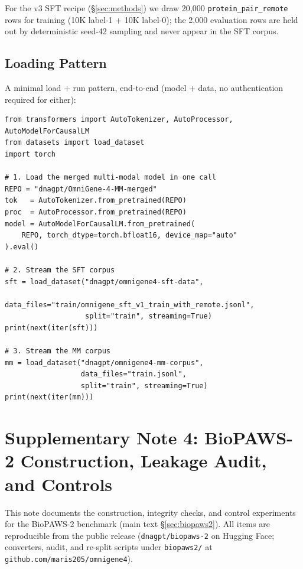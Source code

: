 \documentclass[11pt]{article}
\begin{document}
For the v3 SFT recipe (\S\ref{sec:methods}) we draw 20{,}000 \texttt{protein\_pair\_remote} rows for training (10K label-1 + 10K label-0); the 2{,}000 evaluation rows are held out by deterministic seed-42 sampling and never appear in the SFT corpus.

\subsection*{Loading Pattern}

A minimal load + run pattern, end-to-end (model + data, no authentication
required for either):

\begin{verbatim}
from transformers import AutoTokenizer, AutoProcessor, AutoModelForCausalLM
from datasets import load_dataset
import torch

# 1. Load the merged multi-modal model in one call
REPO = "dnagpt/OmniGene-4-MM-merged"
tok   = AutoTokenizer.from_pretrained(REPO)
proc  = AutoProcessor.from_pretrained(REPO)
model = AutoModelForCausalLM.from_pretrained(
    REPO, torch_dtype=torch.bfloat16, device_map="auto"
).eval()

# 2. Stream the SFT corpus
sft = load_dataset("dnagpt/omnigene4-sft-data",
                   data_files="train/omnigene_sft_v1_train_with_remote.jsonl",
                   split="train", streaming=True)
print(next(iter(sft)))

# 3. Stream the MM corpus
mm = load_dataset("dnagpt/omnigene4-mm-corpus",
                  data_files="train.jsonl",
                  split="train", streaming=True)
print(next(iter(mm)))
\end{verbatim}

\section{Supplementary Note 4: BioPAWS-2 Construction, Leakage Audit, and Controls}
\label{sec:supp-biopaws2}

This note documents the construction, integrity checks, and control experiments for the
BioPAWS-2 benchmark (main text \S\ref{sec:biopaws2}). All items are reproducible from the
public release (\texttt{dnagpt/biopaws-2} on Hugging Face; converters, audit, and re-split
scripts under \texttt{biopaws2/} at \texttt{github.com/maris205/omnigene4}).
\end{document}
